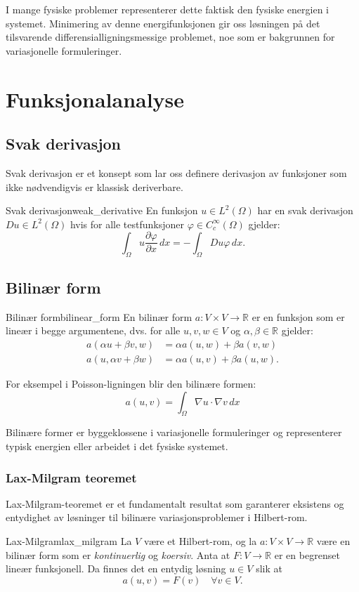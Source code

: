 \documentclass[../main.tex]{subfiles}
\begin{document}
I mange fysiske problemer representerer dette faktisk den fysiske energien i systemet. Minimering av denne energifunksjonen gir oss løsningen på det tilsvarende differensialligningsmessige problemet, noe som er bakgrunnen for variasjonelle formuleringer.

\section{Funksjonalanalyse}

\subsection{Svak derivasjon}
Svak derivasjon er et konsept som lar oss definere derivasjon av funksjoner som ikke nødvendigvis er klassisk deriverbare.
\begin{definition}{Svak derivasjon}{weak_derivative}
	En funksjon $u \in L^2(\Omega)$ har en svak derivasjon $Du \in L^2(\Omega)$ hvis for alle testfunksjoner $\varphi \in C_c^\infty(\Omega)$ gjelder:
	\[
		\int_\Omega u \frac{\partial \varphi}{\partial x} \, dx = -\int_\Omega Du \varphi \, dx.
	\]
\end{definition}

\subsection{Bilinær form}
\begin{definition}{Bilinær form}{bilinear_form}
	En bilinær form $a: V \times V \to \mathbb{R}$ er en funksjon som er lineær i begge argumentene, dvs. for alle $u,v,w \in V$ og $\alpha, \beta \in \mathbb{R}$ gjelder:
	\begin{align*}
		a(\alpha u + \beta v, w) & = \alpha a(u,w) + \beta a(v,w)  \\
		a(u, \alpha v + \beta w) & = \alpha a(u,v) + \beta a(u,w).
	\end{align*}
\end{definition}

For eksempel i Poisson-ligningen blir den bilinære formen:
\begin{equation}
	a(u,v) = \int_\Omega \nabla u \cdot \nabla v \, dx
\end{equation}

Bilinære former er byggeklossene i variasjonelle formuleringer og representerer typisk energien eller arbeidet i det fysiske systemet.

\subsubsection{Lax-Milgram teoremet}
\label{sec:lax_milgram}
Lax-Milgram-teoremet er et fundamentalt resultat som garanterer eksistens og entydighet av løsninger til bilinære variasjonsproblemer i Hilbert-rom.
\begin{theorem}{Lax-Milgram}{lax_milgram}
	La $V$ være et Hilbert-rom, og la $a: V \times V \to \mathbb{R}$ være en bilinær form som er \emph{kontinuerlig} og \emph{koersiv}. Anta at $F: V \to \mathbb{R}$ er en begrenset lineær funksjonell. Da finnes det en entydig løsning $u \in V$ slik at
	\[
		a(u,v) = F(v) \quad \forall v \in V.
	\]
\end{theorem}
\end{document}

